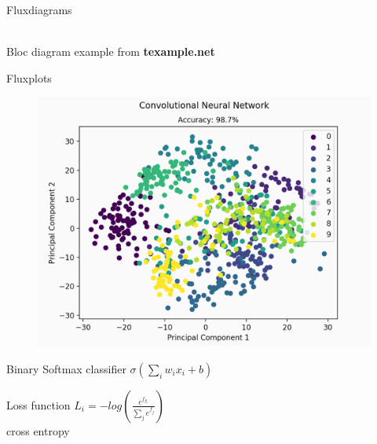 \documentclass[9pt]{beamer}
\begin{document}
\begin{frame}{Flux}{diagrams}
\centering
{}\\[0.4cm]
Bloc diagram example from \textbf{texample.net}
\end{frame}

\begin{frame}{Flux}{plots}
	\begin{minipage}{0.56\textwidth}
		\begin{figure}
			\includegraphics[width=\textwidth]{assets/plot.png}
		\end{figure}
	\end{minipage}
	\hfill
	\begin{minipage}{0.38\textwidth}
		\begin{block}{Binary Softmax classifier}
			\centering
			$\sigma(\sum_i w_ix_i + b)$
		\end{block}
		\begin{exampleblock}{Loss function}
			\centering\vspace*{0.1cm}
			$L_i = -log(\frac{e^{f_{y_i}}}{\sum_j e^{f_j}})$\\[0.1cm]
			cross entropy
		\end{exampleblock}
	\end{minipage}
\end{frame}
\end{document}
